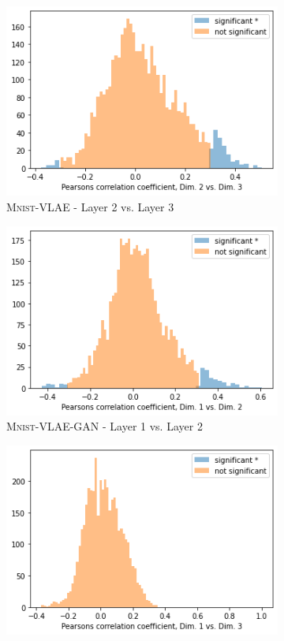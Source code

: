 \begin{figure}
\begin{subfigure}{.3\textwidth}
        \includegraphics[width=\textwidth]{images/notprop/dsprites/vlae/dim_2_3.png}
        \caption{\textsc{Mnist}-VLAE - Layer 2 vs. Layer 3}
    \end{subfigure}
    \begin{subfigure}{.3\textwidth}
        \includegraphics[width=\textwidth]{images/notprop/dsprites/vlae_gan/dim_1_2.png}
        \caption{\textsc{Mnist}-VLAE-GAN - Layer 1 vs. Layer 2}
    \end{subfigure}
    \hfill
    \begin{subfigure}{.3\textwidth}
        \includegraphics[width=\textwidth]{images/notprop/dsprites/vlae_gan/dim_1_3.png}

\end{subfigure}
\end{figure}
